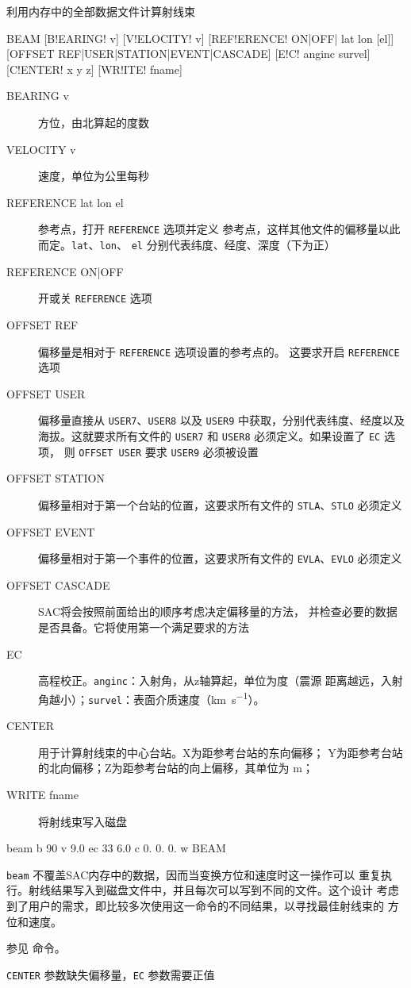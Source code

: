 \label{cmd:beam}

利用内存中的全部数据文件计算射线束

\begin{SACSTX}
BEAM [B!EARING! v] [V!ELOCITY! v] [REF!ERENCE! ON|OFF| lat lon [el]]
    [OFFSET REF|USER|STATION|EVENT|CASCADE] [E!C! anginc survel]
    [C!ENTER! x y z] [WR!ITE! fname]
\end{SACSTX}

\begin{description}
\item [BEARING v] 方位，由北算起的度数
\item [VELOCITY v] 速度，单位为公里每秒
\item [REFERENCE lat lon el] 参考点，打开 \texttt{REFERENCE} 选项并定义
    参考点，这样其他文件的偏移量以此而定。\texttt{lat}、\texttt{lon}、
    \texttt{el} 分别代表纬度、经度、深度（下为正）
\item [REFERENCE ON|OFF] 开或关 \texttt{REFERENCE} 选项
\item [OFFSET REF] 偏移量是相对于 \texttt{REFERENCE} 选项设置的参考点的。
    这要求开启 \texttt{REFERENCE} 选项
\item [OFFSET USER] 偏移量直接从 \texttt{USER7}、\texttt{USER8} 以及
    \texttt{USER9} 中获取，分别代表纬度、经度以及海拔。这就要求所有文件的
    \texttt{USER7} 和 \texttt{USER8} 必须定义。如果设置了 \texttt{EC} 选项，
    则 \texttt{OFFSET USER} 要求 \texttt{USER9} 必须被设置
\item [OFFSET STATION] 偏移量相对于第一个台站的位置，这要求所有文件的
    \texttt{STLA}、\texttt{STLO} 必须定义
\item [OFFSET EVENT] 偏移量相对于第一个事件的位置，这要求所有文件的
    \texttt{EVLA}、\texttt{EVLO} 必须定义
\item [OFFSET CASCADE] SAC将会按照前面给出的顺序考虑决定偏移量的方法，
    并检查必要的数据是否具备。它将使用第一个满足要求的方法
\item [EC] 高程校正。\texttt{anginc}：入射角，从z轴算起，单位为度（震源
    距离越远，入射角越小）；\texttt{survel}：表面介质速度（\si{\km\per\s}）。
\item [CENTER] 用于计算射线束的中心台站。X为距参考台站的东向偏移；
    Y为距参考台站的北向偏移；Z为距参考台站的向上偏移，其单位为 \si{\m}；
\item [WRITE fname] 将射线束写入磁盘
\end{description}

\begin{SACDFT}
beam  b 90  v 9.0 ec 33  6.0 c  0. 0. 0. w BEAM
\end{SACDFT}

\texttt{beam} 不覆盖SAC内存中的数据，因而当变换方位和速度时这一操作可以
重复执行。射线结果写入到磁盘文件中，并且每次可以写到不同的文件。这个设计
考虑到了用户的需求，即比较多次使用这一命令的不同结果，以寻找最佳射线束的
方位和速度。

参见  命令。

\texttt{CENTER} 参数缺失偏移量，\texttt{EC} 参数需要正值
